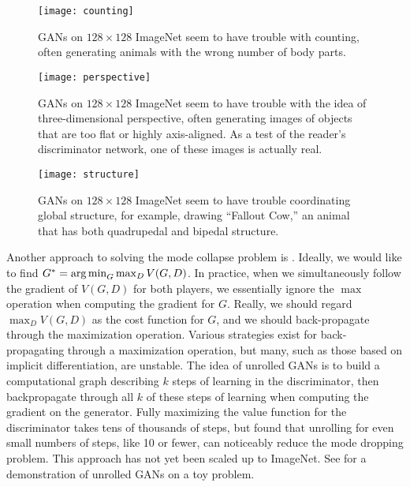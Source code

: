 \begin{figure}
  \centering
  \texttt{[image: counting]}
  \caption{
    GANs on $128\times 128$ ImageNet seem to have trouble with counting, often generating
    animals with the wrong number of body parts.
  }
  \label{fig:counting}
\end{figure}

\begin{figure}
  \centering
  \texttt{[image: perspective]}
  \caption{
    GANs on $128\times 128$ ImageNet seem to have trouble with the idea of three-dimensional
    perspective, often generating images of objects that are too flat or highly axis-aligned.
    As a test of the reader's discriminator network, one of these images is actually real.
  }
  \label{fig:perspective}
\end{figure}

\begin{figure}
  \centering
  \texttt{[image: structure]}
  \caption{
    GANs on $128\times 128$ ImageNet seem to have trouble coordinating global structure,
    for example, drawing ``Fallout Cow,'' an animal that has both quadrupedal and bipedal structure.
  }
  \label{fig:structure}
\end{figure}

Another approach to solving the mode collapse problem is  \citep{metz2016unrolled}.
Ideally, we would like to find $G^* = \operatorname*{arg\,min}_G \max_D V(G, D)$.
In practice, when we simultaneously follow the gradient of $V(G, D)$ for both players, we essentially ignore
the $\max$ operation when computing the gradient for $G$.
Really, we should regard $\max_D V(G,D)$ as the cost function for $G$, and we should back-propagate through
the maximization operation.
Various strategies exist for back-propagating through a maximization operation, but many, such as those
based on implicit differentiation, are unstable.
The idea of unrolled GANs is to build a computational graph describing $k$ steps of learning
in the discriminator, then backpropagate through all $k$ of these steps of learning
when computing the gradient on the generator.
Fully maximizing the value function for the discriminator takes tens of thousands of steps,
but \citet{metz2016unrolled} found that unrolling for even small numbers of steps, like 10 or fewer,
can noticeably reduce the mode dropping problem.
This approach has not yet been scaled up to ImageNet.
See  for a demonstration of unrolled GANs on a toy problem.


